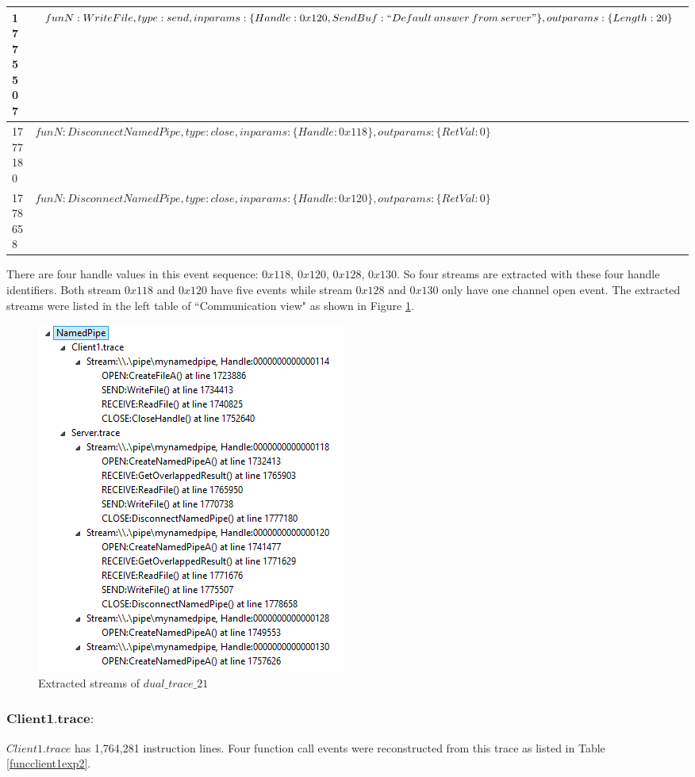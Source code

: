 \begin{table}[H]
\begin{tabular}{|l|p{16cm}|}
\hline
  1775507 & $funN:WriteFile, type:send, inparams:\lbrace Handle:0x120, SendBuf:``Default\: answer\: from\: server"\rbrace, outparams: \lbrace Length:20 \rbrace$\\
\hline
 1777180&$funN:DisconnectNamedPipe, type:close, inparams: \lbrace Handle:0x118 \rbrace, outparams: \lbrace RetVal:0 \rbrace$\\
\hline   
 1778658&$funN:DisconnectNamedPipe, type:close, inparams: \lbrace Handle:0x120 \rbrace, outparams: \lbrace RetVal:0 \rbrace$\\
\hline               
  \end{tabular}
\end{table}

There are four handle values in this event sequence: $0x118$, $0x120$, $0x128$, $0x130$. So four streams are extracted with these four handle identifiers. Both stream $0x118$ and $0x120$ have five events while stream $0x128$ and $0x130$ only have one channel open event. The extracted streams were listed in the left table  of ``Communication view"  as shown in Figure \ref{result21_streams}.

\begin{figure}[H]
\centerline{\includegraphics{Figures/result21_streams}}
 \caption{Extracted streams of $dual\_trace\_21$}
\label{result21_streams}
\end{figure}

\subsubsection{$\boldsymbol{Client1.trace:}$}
$Client1.trace$ has 1,764,281 instruction lines. Four function call events were reconstructed from this trace as listed in Table \ref{funcclient1exp2}.

